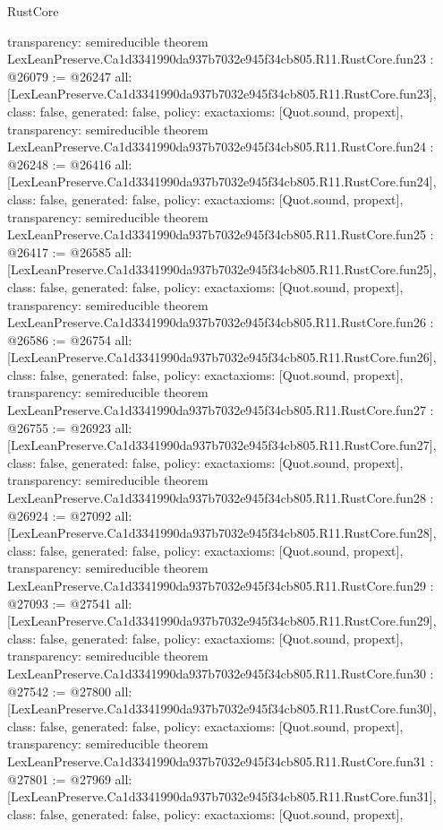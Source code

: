 \begin{lexlean}{RustCore}
\begin{coremodule}
{  transparency: semireducible
}
theorem LexLeanPreserve.Ca1d3341990da937b7032e945f34cb805.R11.RustCore.fun23 : @26079 := @26247 {
  all: [LexLeanPreserve.Ca1d3341990da937b7032e945f34cb805.R11.RustCore.fun23],
  class: false,
  generated: false,
  policy: exact{axioms: [Quot.sound, propext]},
  transparency: semireducible
}
theorem LexLeanPreserve.Ca1d3341990da937b7032e945f34cb805.R11.RustCore.fun24 : @26248 := @26416 {
  all: [LexLeanPreserve.Ca1d3341990da937b7032e945f34cb805.R11.RustCore.fun24],
  class: false,
  generated: false,
  policy: exact{axioms: [Quot.sound, propext]},
  transparency: semireducible
}
theorem LexLeanPreserve.Ca1d3341990da937b7032e945f34cb805.R11.RustCore.fun25 : @26417 := @26585 {
  all: [LexLeanPreserve.Ca1d3341990da937b7032e945f34cb805.R11.RustCore.fun25],
  class: false,
  generated: false,
  policy: exact{axioms: [Quot.sound, propext]},
  transparency: semireducible
}
theorem LexLeanPreserve.Ca1d3341990da937b7032e945f34cb805.R11.RustCore.fun26 : @26586 := @26754 {
  all: [LexLeanPreserve.Ca1d3341990da937b7032e945f34cb805.R11.RustCore.fun26],
  class: false,
  generated: false,
  policy: exact{axioms: [Quot.sound, propext]},
  transparency: semireducible
}
theorem LexLeanPreserve.Ca1d3341990da937b7032e945f34cb805.R11.RustCore.fun27 : @26755 := @26923 {
  all: [LexLeanPreserve.Ca1d3341990da937b7032e945f34cb805.R11.RustCore.fun27],
  class: false,
  generated: false,
  policy: exact{axioms: [Quot.sound, propext]},
  transparency: semireducible
}
theorem LexLeanPreserve.Ca1d3341990da937b7032e945f34cb805.R11.RustCore.fun28 : @26924 := @27092 {
  all: [LexLeanPreserve.Ca1d3341990da937b7032e945f34cb805.R11.RustCore.fun28],
  class: false,
  generated: false,
  policy: exact{axioms: [Quot.sound, propext]},
  transparency: semireducible
}
theorem LexLeanPreserve.Ca1d3341990da937b7032e945f34cb805.R11.RustCore.fun29 : @27093 := @27541 {
  all: [LexLeanPreserve.Ca1d3341990da937b7032e945f34cb805.R11.RustCore.fun29],
  class: false,
  generated: false,
  policy: exact{axioms: [Quot.sound, propext]},
  transparency: semireducible
}
theorem LexLeanPreserve.Ca1d3341990da937b7032e945f34cb805.R11.RustCore.fun30 : @27542 := @27800 {
  all: [LexLeanPreserve.Ca1d3341990da937b7032e945f34cb805.R11.RustCore.fun30],
  class: false,
  generated: false,
  policy: exact{axioms: [Quot.sound, propext]},
  transparency: semireducible
}
theorem LexLeanPreserve.Ca1d3341990da937b7032e945f34cb805.R11.RustCore.fun31 : @27801 := @27969 {
  all: [LexLeanPreserve.Ca1d3341990da937b7032e945f34cb805.R11.RustCore.fun31],
  class: false,
  generated: false,
  policy: exact{axioms: [Quot.sound, propext]},
}
\end{coremodule}
\end{lexlean}

